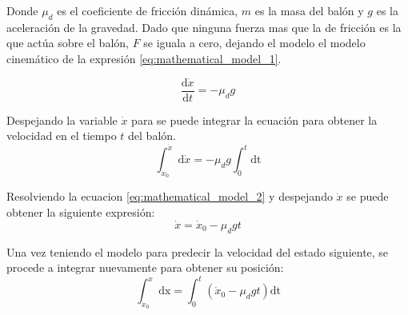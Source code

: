 Donde $\mu_d$ es el coeficiente de fricción dinámica, $m$ es la masa del balón y $g$ es la aceleración de la gravedad. Dado que ninguna fuerza mas que la de fricción es la que actúa sobre el balón, $F$ se iguala a cero, dejando el modelo el modelo cinemático de la expresión \ref{eq:mathematical_model_1}.

\begin{equation}
\frac{\mathrm{d} \dot{x}}{\mathrm{d} t} = - \mu_d g
\label{eq:mathematical_model_1}
\end{equation}

Despejando la variable $\dot{x}$ para se puede integrar la ecuación para obtener la velocidad en el tiempo $t$ del balón.
\begin{equation}
\int_{\dot{x}_0}^{\dot{x}} \mathrm{d} \dot{x} = -\mu_d g \int_{0}^{t} \mathrm{dt}  
\label{eq:mathematical_model_2}
\end{equation}

Resolviendo la ecuacion \ref{eq:mathematical_model_2} y despejando $\dot{x}$ se puede obtener la siguiente expresión:
\begin{equation}
\dot{x} = \dot{x}_{0} - \mu_d g t 
\label{eq:velocity_prediction}
\end{equation}

Una vez teniendo el modelo para predecir la velocidad del estado siguiente, se procede a integrar nuevamente para obtener su posición:
\begin{equation}
\int_{x_{0}}^{x} \mathrm{dx} = \int_{0}^{t} (\dot{x}_{0} - \mu_d g t) \mathrm{dt}
\label{eq:mathematical_model_4}
\end{equation}

